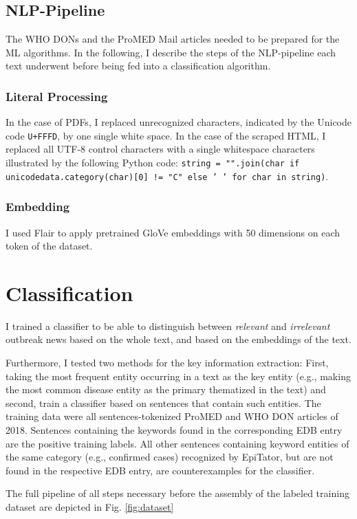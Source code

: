\subsection{NLP-Pipeline}
  The WHO DONs and the ProMED Mail articles needed to be prepared for the ML algorithms.
  In the following, I describe the steps of the NLP-pipeline each text underwent before being fed into a classification algorithm.

\subsubsection{Literal Processing}
  In the case of PDFs, I replaced unrecognized characters, indicated by the Unicode code \texttt{U+FFFD}, by one single white space.
  In the case of the scraped HTML, I replaced all UTF-8 control characters with a single whitespace characters illustrated by the following Python code: \texttt{string = "".join(char if unicodedata.category(char)[0] != "C" else ' ' for char in string)}.

\subsubsection{Embedding}
  I used Flair to apply pretrained GloVe embeddings with 50 dimensions on each token of the dataset.

\section{Classification}
  I trained a classifier to be able to distinguish between \textsl{relevant} and \textsl{irrelevant} outbreak news based on the whole text, and based on the embeddings of the text.

  Furthermore, I tested two methods for the key information extraction: First, taking the most frequent entity occurring in a text as the key entity (e.g., making the most common disease entity as the primary thematized in the text) and second, train a classifier based on sentences that contain such entities.
  The training data were all sentences-tokenized ProMED and WHO DON articles of 2018.
  Sentences containing the keywords found in the corresponding EDB entry are the positive training labels.
  All other sentences containing keyword entities of the same category (e.g., confirmed cases) recognized by EpiTator, but are not found in the respective EDB entry, are counterexamples for the classifier.

  The full pipeline of all steps necessary before the assembly of the labeled training dataset are depicted in Fig. \ref{fig:dataset}

